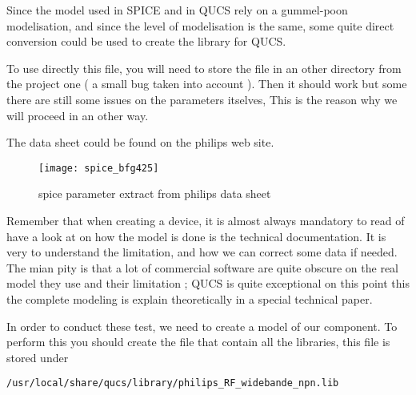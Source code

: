 \bigskip




Since the model used in SPICE and in QUCS rely on a gummel-poon modelisation, and since the level of modelisation is the same, some quite direct conversion could be used to create the library for QUCS.

To use directly this file, you will need to store the file in an other directory from the project one ( a small bug taken into account ). Then it should work but some there are still some issues on the parameters itselves, This is the reason why we will proceed in an other way.

The data sheet could be found on the philips web site. 

\begin{figure}[htbp]
\begin{center}
\texttt{[image: spice\_bfg425]}
\caption{spice parameter extract from philips data sheet}
\label{design:pa:spiceDatasheet}
\end{center}
\end{figure}



Remember that when creating a device, it is almost always mandatory to read of have a look at on how the model is done is the technical documentation. It is very to understand the limitation, and how we can correct some data if needed. The mian pity is that a lot of commercial software are quite obscure on the real model they use and their limitation ; QUCS is quite exceptional  on this point this the complete modeling is explain theoretically in a special technical paper.

\bigskip

In order to conduct these test, we need to create a model of our component. To perform this you should create the file that contain all the libraries, this file is stored under 

\begin{verbatim}
/usr/local/share/qucs/library/philips_RF_widebande_npn.lib
\end{verbatim}

